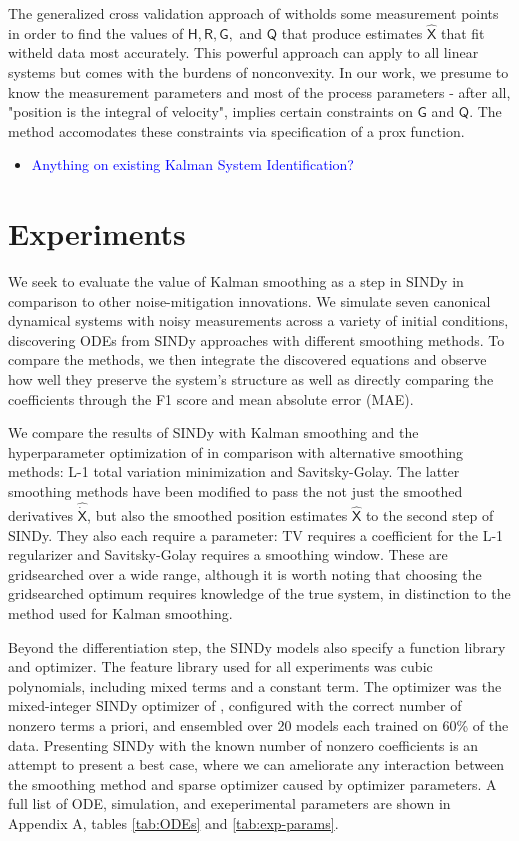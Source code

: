 \documentclass{article}
\newcommand{\blue}[1]{\textcolor{blue}{#1}}
\newcommand{\mat}[1]{\boldsymbol{\mathsf{#1}}}
\begin{document}
The generalized cross validation approach of \cite{Barratt2020} witholds some measurement points in order to find the values of $\mat H, \mat R, \mat G,$ and $\mat Q$ that produce estimates $\hat{\mat X}$ that fit witheld data most accurately.  This powerful approach can apply to all linear systems but comes with the burdens of nonconvexity.  In our work, we presume to know the measurement parameters and most of the process parameters - after all, "position is the integral of velocity", implies certain constraints on $\mat G$ and $\mat Q$.  The method accomodates these constraints via specification of a prox function.

\begin{itemize}
    \item \blue{Anything on existing Kalman System Identification?}
\end{itemize}

\section{Experiments}

We seek to evaluate the value of Kalman smoothing as a step in SINDy in comparison to other noise-mitigation innovations.  We simulate seven canonical dynamical systems with noisy measurements across a variety of initial conditions, discovering ODEs from SINDy approaches with different smoothing methods.  To compare the methods, we then integrate the discovered equations and observe how well they preserve the system's structure as well as directly comparing the coefficients through the F1 score and mean absolute error (MAE).

We compare the results of SINDy with Kalman smoothing and the hyperparameter optimization of \cite{Barratt2020} in comparison with alternative smoothing methods: L-1 total variation minimization and Savitsky-Golay.  The latter smoothing methods have been modified to pass the not just the smoothed derivatives $\mat{\widehat{\dot X}}$, but also the smoothed position estimates $\mat {\widehat X}$ to the second step of SINDy.  They also each require a parameter: TV requires a coefficient for the L-1 regularizer and Savitsky-Golay requires a smoothing window.  These are gridsearched over a wide range, although it is worth noting that choosing the gridsearched optimum requires knowledge of the true system, in distinction to the method used for Kalman smoothing.

Beyond the differentiation step, the SINDy models also specify a function library and optimizer.  The feature library used for all experiments was cubic polynomials, including mixed terms and a constant term.  The optimizer was the mixed-integer SINDy optimizer of \cite{Bertsimas2023}, configured with the correct number of nonzero terms a priori, and ensembled over 20 models each trained on 60\% of the data.  Presenting SINDy with the known number of nonzero coefficients is an attempt to present a best case, where we can ameliorate any interaction between the smoothing method and sparse optimizer caused by optimizer parameters.  A full list of ODE, simulation, and exeperimental parameters are shown in Appendix A, tables \ref{tab:ODEs} and \ref{tab:exp-params}.
\end{document}

